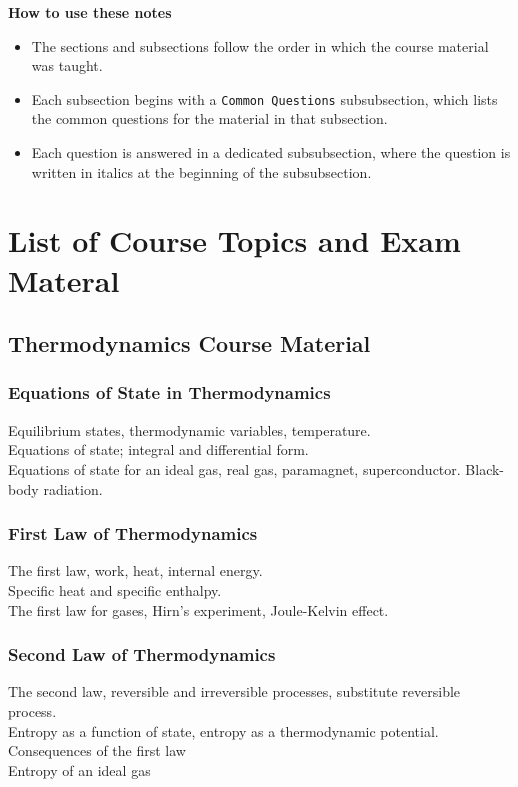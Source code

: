 \documentclass[11pt, a4paper]{article}
\begin{document}
\vspace{5mm}
\textbf{How to use these notes}
\begin{itemize}
    \item The sections and subsections follow the order in which the course material was taught.

    \item Each subsection begins with a \texttt{Common Questions} subsubsection, which lists the common questions for the material in that subsection.

    \item  Each question is answered in a dedicated subsubsection, where the question is written in italics at the beginning of the subsubsection.
\end{itemize}

\newpage

\tableofcontents	


\iffalse
\section{List of Course Topics and Exam Materal}
\subsection{Thermodynamics Course Material}
\subsubsection{Equations of State in Thermodynamics}
Equilibrium states, thermodynamic variables, temperature.\\
Equations of state; integral and differential form.\\
Equations of state for an ideal gas, real gas, paramagnet, superconductor. Black-body radiation.

\subsubsection{First Law of Thermodynamics}
The first law, work, heat, internal energy. \\
Specific heat and specific enthalpy.\\
The first law for gases, Hirn's experiment, Joule-Kelvin effect.

\subsubsection{Second Law of Thermodynamics}
The second law, reversible and irreversible processes, substitute reversible process.\\ Entropy as a function of state, entropy as a thermodynamic potential. \\
Consequences of the first law\\
Entropy of an ideal gas
\end{document}
